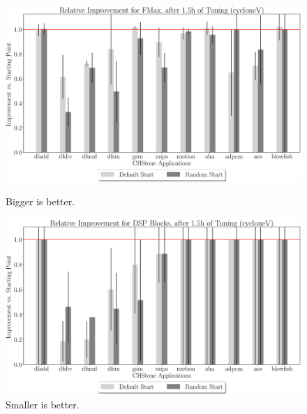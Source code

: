 \documentclass[12pt, a4paper]{article}
\begin{document}
\begin{figure}[htpb]
    \centering
    \begin{minipage}{.48\textwidth}
        \centering
        \includegraphics[width=.8\textwidth]{rel_comp_fmax_5400_chstone_cycloneV}
        \caption{Bigger is better.}
    \end{minipage}%
    \begin{minipage}{.48\textwidth}
        \centering
        \includegraphics[width=.8\textwidth]{rel_comp_dsp_5400_chstone_cycloneV}
        \caption{Smaller is better.}
    \end{minipage}%


\end{figure}
\end{document}
